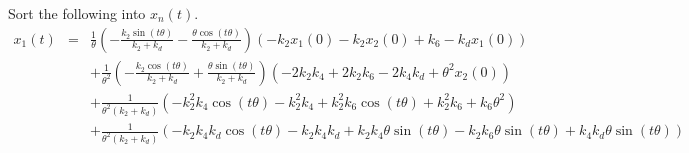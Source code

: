 \documentclass[11pt]{article}
\begin{document}
Sort the following into $x_n(t)$.
\begin{eqnarray*}
x_1 (t) & =  &
\frac{1}{\theta}
\left(- \frac{k_{2} \sin{\left(t \theta \right)}}{k_{2} + k_{d}} - \frac{\theta \cos{\left(t \theta \right)}}{k_{2} + k_{d}}\right)
\left(- k_{2} x_1 (0) - k_{2} x_2 (0) + k_{6} - k_{d} x_1 (0)\right)\\
& & + \frac{1}{\theta^2}
\left(- \frac{k_{2} \cos{\left(t \theta \right)}}{k_{2} + k_{d}} + \frac{\theta \sin{\left(t \theta \right)}}{k_{2} + k_{d}}\right) \left(- 2 k_{2} k_{4} + 2 k_{2} k_{6} - 2 k_{4} k_{d} + \theta^{2} x_2 (0)\right)   \\
& & + \frac{1}{\theta^2 (k_2 + k_d)} \left(
- k_{2}^{2} k_{4} \cos{\left(t \theta \right)} - k_{2}^{2} k_{4} + k_{2}^{2} k_{6} \cos{\left(t \theta \right) + k_2^2 k_6 + k_6 \theta^2} \right) \\
& & + \frac{1}{\theta^2 (k_2 + k_d)} \left(
- k_{2} k_{4} k_{d} \cos{\left(t \theta \right)} - k_{2} k_{4} k_{d} 
 + k_{2} k_{4} \theta \sin{\left(t \theta \right)} - k_{2} k_{6} \theta \sin{\left(t \theta \right)} + k_{4} k_{d} \theta \sin{\left(t \theta \right)} \right)
\end{eqnarray*}
\end{document}
